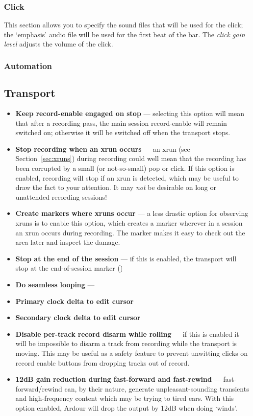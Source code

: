 \documentclass[10pt,a4paper]{book}
\newcommand{\todo}[1]{\marginpar{\small\texttt{#1}}}
\begin{document}
{\subsubsection{Click}

This section allows you to specify the sound files that will be used
for the click; the `emphasis' audio file will be used for the first
beat of the bar.  The \emph{click gain level} adjusts the volume of
the click.

\subsubsection{Automation}


\subsection{Transport}

\begin{itemize}
\item \textbf{Keep record-enable engaged on stop} --- selecting this
  option will mean that after a recording pass, the main session
  record-enable will remain switched on; otherwise it will be switched
  off when the transport stops.
\item \textbf{Stop recording when an xrun occurs} --- an xrun (see
  Section~\ref{sec:xruns}) during recording could well mean that the
  recording has been corrupted by a small (or not-so-small) pop or
  click.  If this option is enabled, recording will stop if an xrun is
  detected, which may be useful to draw the fact to your attention.
  It may \emph{not} be desirable on long or unattended recording
  sessions!
\item \textbf{Create markers where xruns occur} --- a less drastic
  option for observing xruns is to enable this option, which creates a
  marker wherever in a session an xrun occurs during recording.  The
  marker makes it easy to check out the area later and inspect the
  damage.
\item \textbf{Stop at the end of the session} --- if this is enabled,
  the transport will stop at the end-of-session marker (\todo{does it
    stop during record too?})
\item \textbf{Do seamless looping} --- \todo{hmm!}
\item \textbf{Primary clock delta to edit cursor}
\item \textbf{Secondary clock delta to edit cursor}
\item \textbf{Disable per-track record disarm while rolling} --- if
  this is enabled it will be impossible to disarm a track from
  recording while the transport is moving.  This may be useful as a
  safety feature to prevent unwitting clicks on record enable buttons
  from dropping tracks out of record.
\item \textbf{12dB gain reduction during fast-forward and fast-rewind}
  --- fast-forward/rewind can, by their nature, generate
  unpleasant-sounding transients and high-frequency content which may
  be trying to tired ears.  With this option enabled, Ardour will drop
  the output by 12dB when doing `winds'.
\end{itemize}

}
\end{document}
